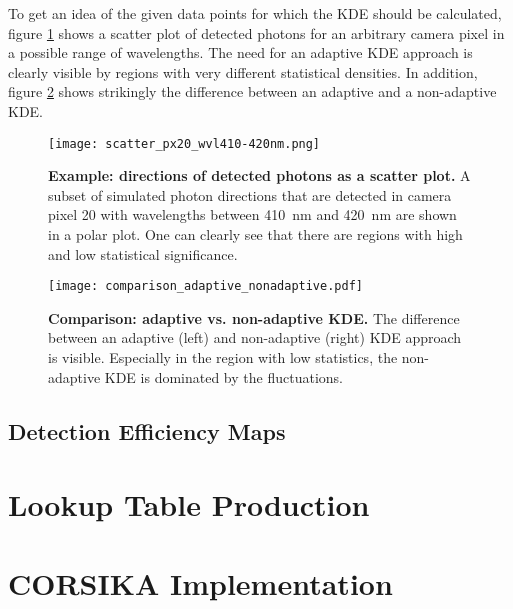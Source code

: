 To get an idea of the given data points for which the KDE should be calculated, figure \ref{kde:example_scatter} shows a scatter plot of detected photons for an arbitrary camera pixel in a possible range of wavelengths. The need for an adaptive KDE approach is clearly visible by regions with very different statistical densities. In addition, figure \ref{kde:comparison} shows strikingly the difference between an adaptive and a non-adaptive KDE.

\begin{figure}[h]
	\centering
	\texttt{[image: scatter\_px20\_wvl410-420nm.png]}
	\caption[Example: directions of detected photons as a scatter plot]{\textbf{Example: directions of detected photons as a scatter plot.} A subset of simulated photon directions that are detected in camera pixel 20 with wavelengths between \SI{410}{\nano\meter} and \SI{420}{\nano\meter} are shown in a polar plot. One can clearly see that there are regions with high and low statistical significance.}
	\label{kde:example_scatter}	
\end{figure}

\begin{figure}[h]
	\centering
	\texttt{[image: comparison\_adaptive\_nonadaptive.pdf]}
	\caption[Comparison: adaptive vs. non-adaptive KDE]{\textbf{Comparison: adaptive vs. non-adaptive KDE.} The difference between an adaptive (left) and non-adaptive (right) KDE approach is visible. Especially in the region with low statistics, the non-adaptive KDE is dominated by the fluctuations.}
	\label{kde:comparison}	
\end{figure}

\subsection{Detection Efficiency Maps}

\section{Lookup Table Production}

\section{CORSIKA Implementation}
